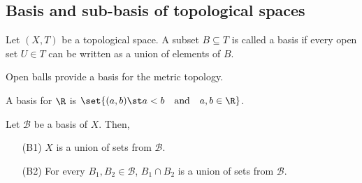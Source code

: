 \subsection{Basis and sub-basis of topological spaces}
\begin{ndfn}
  Let $(X,T)$ be a topological space. A subset $B \subseteq T$ is called a basis if every open set $U \in T$ can be written as a union of elements of $B$.
\end{ndfn}

\begin{negg}
  Open balls provide a basis for the metric topology.\eggqed
\end{negg}

\begin{negg}
  A basis for $\R$ is $\set{(a,b) \st a<b \quad\text{and}\quad a,b\in\R}$.\eggqed
\end{negg}

\begin{nlemma}
  Let $\mathcal{B}$ be a basis of $X$. Then,
  \begin{enumerate}[leftmargin=15mm]
  \item[(B1)] $X$ is a union of sets from $\mathcal{B}$.
  \item[(B2)] For every $B_1, B_2 \in \mathcal{B}$, $B_1 \cap B_2$ is a union of sets from $\mathcal{B}$.
  \end{enumerate}
\end{nlemma}

